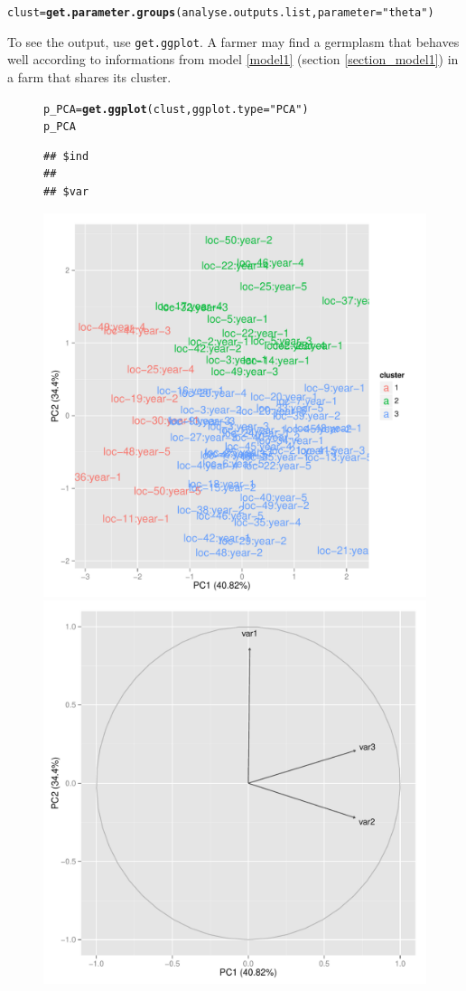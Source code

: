 \documentclass{article}\usepackage[]{graphicx}\usepackage[]{color}
\makeatletter
\newcommand{\hlstr}[1]{\textcolor[rgb]{0.192,0.494,0.8}{#1}}%
\newcommand{\hlstd}[1]{\textcolor[rgb]{0.345,0.345,0.345}{#1}}%
\newcommand{\hlkwb}[1]{\textcolor[rgb]{0.69,0.353,0.396}{#1}}%
\newcommand{\hlkwc}[1]{\textcolor[rgb]{0.333,0.667,0.333}{#1}}%
\newcommand{\hlkwd}[1]{\textcolor[rgb]{0.737,0.353,0.396}{\textbf{#1}}}%
\newenvironment{kframe}{%
 \def\at@end@of@kframe{}%
 \ifinner\ifhmode%
  \def\at@end@of@kframe{\end{minipage}}%
  \begin{minipage}{\columnwidth}%
 \fi\fi%
 \def\FrameCommand##1{\hskip\@totalleftmargin \hskip-\fboxsep
 \colorbox{shadecolor}{##1}\hskip-\fboxsep
     \hskip-\linewidth \hskip-\@totalleftmargin \hskip\columnwidth}%
 \MakeFramed {\advance\hsize-\width
   \@totalleftmargin\z@ \linewidth\hsize
   \@setminipage}}%
 {\par\unskip\endMakeFramed%
 \at@end@of@kframe}
\newenvironment{knitrout}{}{} %
\makeatother
\begin{document}
\begin{knitrout}
\begin{kframe}
\begin{alltt}
\hlstd{clust} \hlkwb{=} \hlkwd{get.parameter.groups}\hlstd{(analyse.outputs.list,} \hlkwc{parameter} \hlstd{=} \hlstr{"theta"}\hlstd{)}
\end{alltt}
\end{kframe}
\end{knitrout}

To see the output, use \texttt{get.ggplot}.
A farmer may find a germplasm that behaves well according to informations from model \ref{model1} (section \ref{section_model1}) in a farm that shares its cluster.

\begin{figure}[H]
\begin{knitrout}
\color{fgcolor}\begin{kframe}
\begin{alltt}
\hlstd{p_PCA} \hlkwb{=} \hlkwd{get.ggplot}\hlstd{(clust,} \hlkwc{ggplot.type} \hlstd{=} \hlstr{"PCA"}\hlstd{)}
\hlstd{p_PCA}
\end{alltt}
\begin{verbatim}
## $ind
## 
## $var
\end{verbatim}
\end{kframe}


{\centering \includegraphics[width=.6\textwidth]{figures/PPBstats_unnamed-chunk-47-1} 
\includegraphics[width=.6\textwidth]{figures/PPBstats_unnamed-chunk-47-2} 

}



\end{knitrout}
\end{figure}
\end{document}

